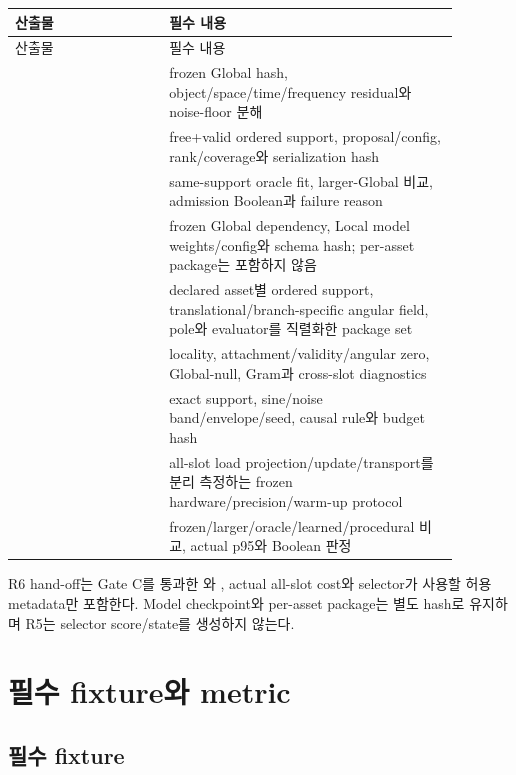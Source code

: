 \documentclass[10pt,a4paper]{article}
\begin{document}
\begin{longtable}{L{0.31\linewidth}L{0.57\linewidth}}
\toprule
산출물 & 필수 내용\\
\midrule
\endfirsthead
\toprule
산출물 & 필수 내용\\
\midrule
\endhead
{} & frozen Global hash, object/space/time/frequency residual와 noise-floor 분해\\
 & free+valid ordered support, proposal/config, rank/coverage와 serialization hash\\
 & same-support oracle fit, larger-Global 비교, admission Boolean과 failure reason\\
 & frozen Global dependency, Local model weights/config와 schema hash; per-asset package는 포함하지 않음\\
 & declared asset별 ordered support, translational/branch-specific angular field, pole와 evaluator를 직렬화한 package set\\
 & locality, attachment/validity/angular zero, Global-null, Gram과 cross-slot diagnostics\\
 & exact support, sine/noise band/envelope/seed, causal rule와 budget hash\\
 & all-slot load projection/update/transport를 분리 측정하는 frozen hardware/precision/warm-up protocol\\
 & frozen/larger/oracle/learned/procedural 비교, actual p95와 Boolean 판정\\
\bottomrule
\end{longtable}

R6 hand-off는 Gate C를 통과한 와 ,
actual all-slot cost와 selector가 사용할 허용 metadata만 포함한다. Model checkpoint와 per-asset package는
별도 hash로 유지하며 R5는 selector score/state를 생성하지 않는다.

\section{필수 fixture와 metric}
\label{sec:r5-chapter-7}

\subsection{필수 fixture}
\end{document}
